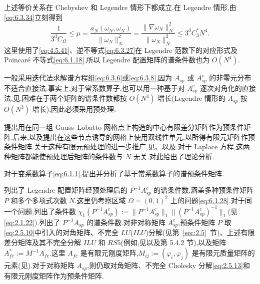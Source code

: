 上述等价关系在 Chebyshev 和 Legendre 情形下都成立.在 Legendre 情形,由\eqref{eq:6.3.34}立刻得到
\[
  \frac{1}{3^d C_\Omega}\le\mu
    =\frac{a_N(\omega_N,\omega_N)}{\|\omega_N\|_N^2}
    =\frac{\|\nabla\omega_N\|_N^2}{\|\omega_N\|_N^2}
    \le3^d C_3^* N^4.
\]
这里使用了\eqref{eq:4.5.41}、逆不等式\eqref{eq:6.3.27}在 Legendre 范数下的对应形式及 Poincaré 不等式\eqref{eq:6.1.18}.所以 Legendre 配置矩阵的谱条件数也为 \(O(N^4)\).

一般采用迭代法求解谱方程组\eqref{eq:6.3.6}或\eqref{eq:6.3.8},因为 \(A_{sp}\) 或 \(A_{sp}^c\) 的非零元分布不适合直接法.事实上,对于常系数算子,也可以用一种基于对 \(A_{sp}^c\) 逐次对角化的直接法,见.困难在于两个矩阵的谱条件数都按 \(O(N^4)\) 增长(Legendre 情形的 \(A_{sp}\) 按 \(O(N^3)\) 增长),因此必须采用预处理.

提出用在同一组 Gauss--Lobatto 网格点上构造的中心有限差分矩阵作为预条件矩阵.后来,以及提出在这些节点诱导的网格上使用双线性单元,以所得有限元矩阵作预条件矩阵.关于这种有限元预处理的进一步推广,见、以及.对于 Laplace 方程,这两种矩阵都能使预处理后矩阵的条件数与 \(N\) 无关.对此给出了理论分析.

对于变系数算子\eqref{eq:6.1.1},提出并分析了基于常系数算子的谱预条件矩阵.

列出了 Legendre 配置矩阵经预处理后的 \(P^{-1}A_{sp}^c\) 的谱条件数,涵盖多种预条件矩阵 \(P\) 和多个多项式次数 \(N\).这里仍考察区域 \(\Omega=(0,1)^2\) 上的问题\eqref{eq:6.1.28}.对于同一个问题,列出了条件数
\(\chi_1(P^{-1}A_{sp}^c):=\|P^{-1}A_{sp}^c\|_1\|(P^{-1}A_{sp}^c)^{-1}\|_1\)(见\eqref{eq:2.1.22}).列出了 \(P^{-1}A_{sp}\) 的谱条件数.对非对称矩阵 \(A_{sp}^c\),预条件矩阵 \(P\) 取\eqref{eq:2.5.10}中引入的对角矩阵、不完全 \(LU\)(\(ILU\))分解(见第~\ref{sec:2.5}~节)、上述有限差分矩阵及其不完全分解 \(ILU\) 和 \(RS5\)(例如,见以及第 5.4.2 节),以及矩阵 \(A_{fe}^*:=M^{-1}A_{fe}\).这里 \(A_{fe}\) 是有限元刚度矩阵,\(M_{ij}:=(\varphi_i,\varphi_j)\) 是有限元质量矩阵的元素(见).对于对称矩阵 \(A_{sp}\),则仍取对角矩阵、不完全 Cholesky 分解\eqref{eq:2.5.13}和有限元刚度矩阵作为预条件矩阵.


